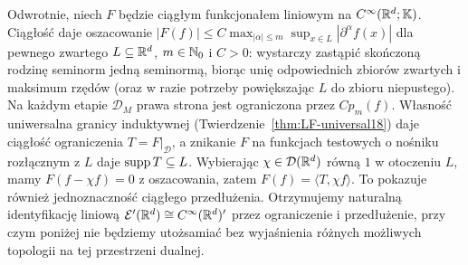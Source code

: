 \begin{uwaga}
\label{rem:Eprime21}
Odwrotnie, niech $F$ będzie ciągłym funkcjonałem liniowym na
$C^\infty(\mathbb R^d;\mathbb K)$. Ciągłość daje oszacowanie
$|F(f)|\le C\max_{|\alpha|\le m}\sup_{x\in L}|\partial^\alpha f(x)|$
dla pewnego zwartego $L\subseteq\mathbb R^d$, $m\in\mathbb N_0$ i $C>0$:
wystarczy zastąpić skończoną rodzinę seminorm jedną seminormą,
biorąc unię odpowiednich zbiorów zwartych i maksimum rzędów
(oraz w razie potrzeby powiększając $L$ do zbioru niepustego).
Na każdym etapie $\mathcal D_M$ prawa strona jest ograniczona
przez $Cp_m(f)$. Własność uniwersalna granicy induktywnej
(Twierdzenie~\ref{thm:LF-universal18}) daje ciągłość ograniczenia
$T=F|_{\mathcal D}$, a znikanie $F$ na funkcjach testowych
o nośniku rozłącznym z $L$ daje $\operatorname{supp} T\subseteq L$.
Wybierając $\chi\in\mathcal D(\mathbb R^d)$ równą $1$ w otoczeniu $L$, mamy
$F(f-\chi f)=0$ z oszacowania, zatem $F(f)=\langle T,\chi f\rangle$.
To pokazuje również jednoznaczność ciągłego przedłużenia.
Otrzymujemy naturalną identyfikację liniową
$\mathcal E'(\mathbb R^d)\cong C^\infty(\mathbb R^d)'$ przez ograniczenie
i przedłużenie, przy czym poniżej
nie będziemy utożsamiać bez wyjaśnienia różnych możliwych
topologii na tej przestrzeni dualnej.
\end{uwaga}

